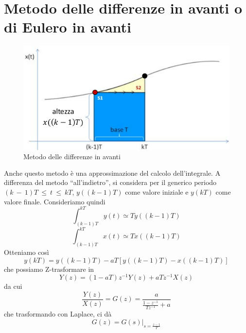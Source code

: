 \documentclass[a4paper]{report}
\begin{document}
\section{Metodo delle differenze in avanti o di Eulero in avanti}
\begin{figure}[!h]
  \begin{center}
    \includegraphics[scale=0.4]{./figures/euleroAvanti00.png}
    \caption{Metodo delle differenze in
      avanti}\label{fig:euleroAvanti00}
  \end{center}
\end{figure}
Anche questo metodo \`e una approssimazione del calcolo
dell'integrale. A differenza del metodo ``all'indietro'', si considera
per il generico periodo$(k~-~1)T~\leq~t~\leq~kT$, $y((k - 1)T)$ come
valore iniziale e $y(kT)$ come valore finale. Consideriamo quindi
\[
\int_{(k - 1)T}^{kT} y(t) \simeq Ty((k - 1)T)
\]
\[
\int_{(k - 1)T}^{kT} x(t) \simeq Tx((k - 1)T)
\]
Otteniamo cos\`i
\[
y(kT) = y((k - 1)T) - aT[y((k - 1)T) - x((k - 1)T)]
\]
che possiamo Z-trasformare in
\[
Y(z) = (1 - aT)z^{-1}Y(z) + aTz^{-1}X(z)
\]
da cui
\[
\dfrac{Y(z)}{X(z)} = G(z) = \dfrac{a}{\frac{1 - z^{-1}}{Tz^{-1}} + a}
\]
che trasformando con Laplace, ci d\`a
\[
G(z) = G(s)|_{s = \frac{z - 1}{T}}
\]
\end{document}
